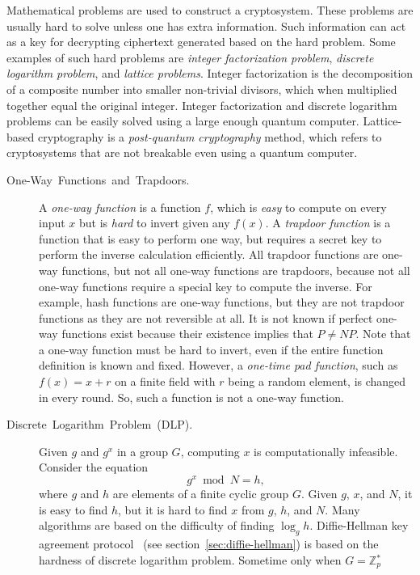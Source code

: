 \documentclass[11pt]{article}
\theoremstyle{plain}
\begin{document}
Mathematical problems are used to construct a cryptosystem. These
problems are usually hard to solve unless one has extra information.
Such information can act as a key for decrypting ciphertext generated
based on the hard problem. Some examples of such hard problems are
\emph{integer factorization problem}, \emph{discrete logarithm problem},
and \emph{lattice problems}. Integer factorization is the decomposition
of a composite number into smaller non-trivial divisors, which when
multiplied together equal the original integer. Integer factorization
and discrete logarithm problems can be easily solved using a large
enough quantum computer. Lattice-based cryptography is a \emph{post-quantum
	cryptography} method, which refers to cryptosystems that are not breakable
even using a quantum computer.
\begin{description}
	\item [{One-Way~Functions~and~Trapdoors.\label{sec:One-Way-Functions}}] A
	\emph{one-way function} is a function $f$, which is \emph{easy} to
	compute on every input $x$ but is \emph{hard} to invert given any
	$f(x)$. A \emph{trapdoor function} is a function that is easy to
	perform one way, but requires a secret key to perform the inverse
	calculation efficiently. All trapdoor functions are one-way functions,
	but not all one-way functions are trapdoors, because not all one-way
	functions require a special key to compute the inverse. For example,
	hash functions are one-way functions, but they are not trapdoor functions
	as they are not reversible at all. It is not known if perfect one-way
	functions exist because their existence implies that $P\neq NP$.
	Note that a one-way function must be hard to invert, even if the entire
	function definition is known and fixed. However, a \emph{one-time
		pad function}, such as $f(x)=x+r$ on a finite field with $r$ being
	a random element, is changed in every round. So, such a function is
	not a one-way function.
	\item [{Discrete~Logarithm~Problem~(DLP).}] Given $g$ and $g^{x}$
	in a group $G$, computing $x$ is computationally infeasible. Consider
	the equation 
	\[
	g^{x}\bmod{N}=h,
	\]
	where $g$ and $h$ are elements of a finite cyclic group $G$. Given
	$g$, $x$, and $N$, it is easy to find $h$, but it is hard to find
	$x$ from $g$, $h$, and $N$. Many algorithms are based on the difficulty
	of finding $\log_{g}{h}$. Diffie-Hellman key agreement protocol~\cite{Diffie:2006:NDC:2263321.2269104}
	(see section~\ref{sec:diffie-hellman}) is based on the hardness
	of discrete logarithm problem. Sometime only when $G=\mathbb{Z}{}_{p}^{*}$

\end{description}
\end{document}
